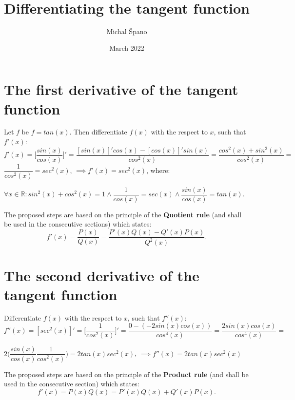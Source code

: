 \documentclass[10pt,a4paper]{article}
\title{Differentiating the \textbf{tangent} function}
\author{Michal Špano}
\date{March 2022}
\begin{document}
\maketitle


\section{The first derivative of the tangent function}

Let $f$ be $f = tan(x)$. Then differentiate $f(x)$ with the respect to $x$, such that $f'(x)$: \\

$f'(x) = \Bigg [ \dfrac{sin(x)}{cos(x)} \Bigg ] ' =
\dfrac{[sin(x)]'cos(x) - [cos(x)]'sin(x)}{cos^{2}(x)} =
\dfrac{cos^{2}(x) + sin^{2}(x)}{cos^{2}(x)} =$ 
$\dfrac{1}{cos^{2}(x)} = sec^{2}(x)$, $\implies f'(x)=sec^{2}(x)$, where:

 $\forall x \in \mathbb{R}: sin^{2}(x) + cos^{2}(x) = 1 
 \land \dfrac{1}{cos(x)} = sec(x) 
 \land \dfrac{sin(x)}{cos(x)} = tan(x)$. 
 
 The proposed steps are based on the principle of the \textbf{Quotient rule} (and shall be used in the consecutive sections) which states:
\[
f'(x) = \dfrac{P(x)}{Q(x)} = \dfrac{P'(x)Q(x)-Q'(x)P(x)}{Q^{2}(x)}.
\]

\section{The second derivative of the tangent function}
Differentiate $f(x)$ with the respect to $x$, such that $f''(x)$: \\

$f''(x) = [sec^{2}(x)]' = 
\Big[ \dfrac{1}{cos^{2}(x)} \Big]' = 
\dfrac{0-(-2sin(x)cos(x))}{cos^{4}(x)} = 
\dfrac{2sin(x)cos(x)}{cos^{4}(x)} = $

$2 \Bigg( \dfrac{sin(x)}{cos(x)} \dfrac{1}{cos^{2}(x)} \Bigg) = 
2 tan(x) sec^{2}(x)$, $\implies f''(x) = 
2 tan(x) sec^{2}(x)$

The proposed steps are based on the principle of the \textbf{Product rule} (and shall be used in the consecutive section) which states:
\[
f'(x) = P(x) Q(x) = P'(x) Q(x) + Q'(x) P(x).
\]
\end{document}
